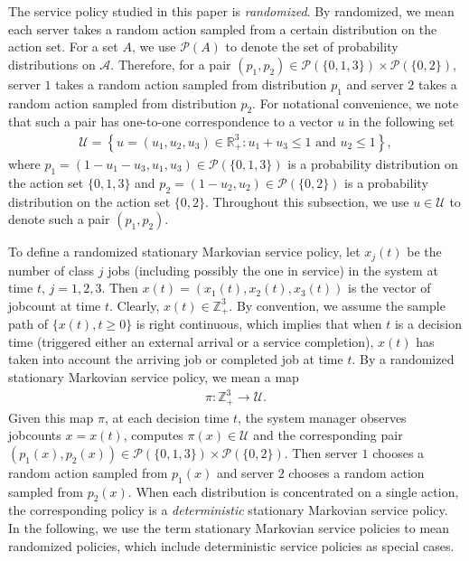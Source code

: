 \documentclass[11pt]{article}
\newcommand{\red}[1]{\textcolor{red}{#1}}
\newcommand{\R}{\mathbb{R}}
\newcommand{\Z}{\mathbb{Z}}
\newcommand{\A}{\mathcal{A}}
\theoremstyle{definition}
\numberwithin{equation}{section}
\begin{document}
The service policy studied in this paper is \textit{randomized}.  By
randomized, we mean each server takes a random action sampled from  a
certain distribution on the action set.  For a set $A$, we use
$\mathcal{P}(A)$ to denote the set of probability distributions on
$\A$. Therefore, for a pair $(p_1,p_2)\in \mathcal{P}(\{0,1,3\})\times \mathcal{P}(\{0,2\})$, server $1$ takes a random action sampled from distribution $p_1$ and server $2$ takes  a random action sampled from distribution $p_2$.  For notational convenience, we note that such a pair has one-to-one correspondence to a vector $u$ in the following set
\begin{align*}
  \mathcal{U}=\left\{u= \left(u_1, u_2, u_3\right)\in \R^3_+: u_1+u_3\le 1 \text{ and } u_2\le 1\right\},
\end{align*}
where $p_1 = (1-u_1-u_3, u_1, u_3)\in \mathcal{P}(\{0, 1, 3\})$ is a
probability distribution on the action set $\{0, 1, 3\}$ and
$p_2 = (1-u_2, u_2)\in \mathcal{P}(\{0, 2\})$ is a probability
distribution on the action set $\{0,2\}$. Throughout this subsection, we use
$u\in \mathcal{U}$ to denote such a pair $(p_1, p_2)$.


To define a randomized stationary Markovian service policy, let $x_j(t)$ be the number of class $j$ jobs (including possibly the one in service) in the system  at
time $t$, $j=1,2, 3$.  Then $x(t) = \left(x_1(t), x_2(t), x_3(t)\right )$ is
  the vector of jobcount at time $t$. Clearly, $x(t)\in \Z_+^3$. By convention, we assume the sample path of $\{x(t), t\ge 0\}$ is right continuous, which implies that when $t$ is a decision time (triggered either an external arrival  or a service completion), $x(t)$ has taken into account the  arriving job or completed job at time $t$.
By a randomized stationary Markovian service policy, we mean a map
\begin{align*}
  \pi: \Z_+^3 \to \mathcal{U}.
\end{align*}
Given this map $\pi$, at each decision time $t$, the system manager
observes jobcounts $x=x(t)$, computes $\pi(x)\in \mathcal{U}$ and the
corresponding pair
$(p_1(x), p_2(x))\in \mathcal{P}(\{0, 1, 3\})\times \mathcal{P}(\{0,
2\})$. Then server $1$ chooses a random action sampled from $p_1(x)$ and
server $2$ chooses a random action sampled from $p_2(x)$. When each
distribution is concentrated on a single action, the corresponding policy is
a \emph{deterministic} stationary Markovian service policy. In the following, we use the term  stationary Markovian service policies to mean  randomized
policies, which include deterministic service policies as special cases.
\end{document}
